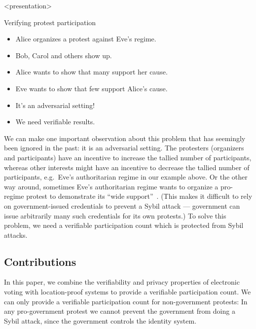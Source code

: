 \begin{frame}<presentation>
  \begin{block}{Verifying protest participation}
    \begin{itemize}
      \item Alice organizes a protest against Eve's regime.
      \item Bob, Carol and others show up.

        \pause{}

      \item {\color{green} Alice wants to show that many support her cause.}

        \pause{}

      \item {\color{red} Eve wants to show that few support Alice's cause.}
      \item It's an adversarial setting!
      \item We need verifiable results.
    \end{itemize}
  \end{block}
\end{frame}

We can make one important observation about this problem that has seemingly 
been ignored in the past: it is an adversarial setting.
The protesters (organizers and participants) have an incentive to increase the 
tallied number of participants, whereas other interests might have an incentive 
to decrease the tallied number of participants, e.g.\ Eve's authoritarian 
regime in our example above.
Or the other way around, sometimes Eve's authoritarian regime wants to organize 
a pro-regime protest to demonstrate its \enquote{wide 
  support}~\cite[e.g.][]{AlJazeeraOnVenezuela2017,VenezuelanStateWorkersCalledToParticipate}.
(This makes it difficult to rely on government-issued credentials to prevent a 
Sybil attack --- government can issue arbitrarily many such credentials for its 
own protests.)
To solve this problem, we need a verifiable participation count which is 
protected from Sybil attacks.

\subsection<article>{Contributions}

In this paper, we combine the verifiability and privacy properties of 
electronic voting with location-proof systems to provide a verifiable 
participation count.
We can only provide a verifiable participation count for non-government 
protests:
In any pro-government protest we cannot prevent the government from doing a 
Sybil attack, since the government controls the identity system.



